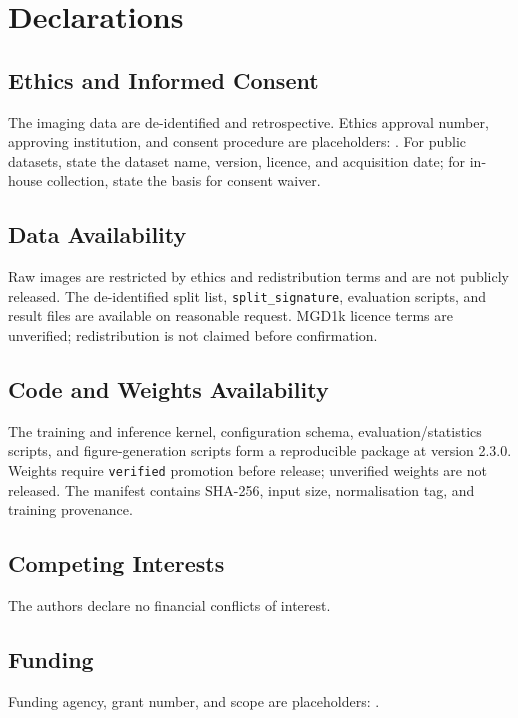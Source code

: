 \section*{Declarations}

\subsection*{Ethics and Informed Consent}
The imaging data are de-identified and retrospective. Ethics approval number, approving institution, and consent procedure are placeholders: . For public datasets, state the dataset name, version, licence, and acquisition date; for in-house collection, state the basis for consent waiver.

\subsection*{Data Availability}
Raw images are restricted by ethics and redistribution terms and are not publicly released. The de-identified split list, \texttt{split\_signature}, evaluation scripts, and result files are available on reasonable request. MGD1k licence terms are unverified; redistribution is not claimed before confirmation.

\subsection*{Code and Weights Availability}
The training and inference kernel, configuration schema, evaluation/statistics scripts, and figure-generation scripts form a reproducible package at version 2.3.0. Weights require \texttt{verified} promotion before release; unverified weights are not released. The manifest contains SHA-256, input size, normalisation tag, and training provenance.

\subsection*{Competing Interests}
The authors declare no financial conflicts of interest. 

\subsection*{Funding}
Funding agency, grant number, and scope are placeholders: .

